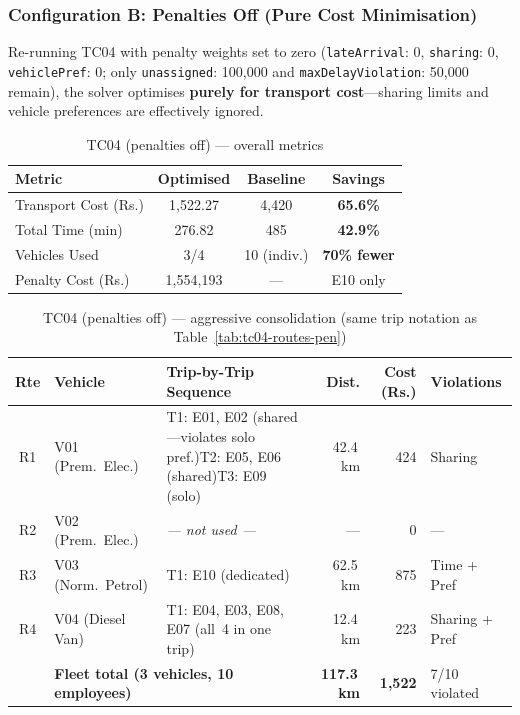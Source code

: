 \documentclass[11pt,a4paper]{article}
\newcommand{\rupee}{Rs.}
\newcommand{\code}[1]{\texttt{#1}}
\newcommand{\saving}[1]{\textcolor{velgreen}{\textbf{#1}}}
\newcommand{\xmark}{\textcolor{velred}{\ding{55}}}
\begin{document}
\subsubsection{Configuration B: Penalties Off (Pure Cost Minimisation)}

Re-running TC04 with penalty weights set to zero (\code{lateArrival}: 0, \code{sharing}: 0, \code{vehiclePref}: 0; only \code{unassigned}: 100,000 and \code{maxDelayViolation}: 50,000 remain), the solver optimises \textbf{purely for transport cost}---sharing limits and vehicle preferences are effectively ignored.

\begin{table}[H]
\centering
\caption{TC04 (penalties off) --- overall metrics}
\small
\begin{tabular}{lccc}
\toprule
\textbf{Metric} & \textbf{Optimised} & \textbf{Baseline} & \textbf{Savings} \\
\midrule
\rowcolor{rowalt}
Transport Cost (\rupee) & 1,522.27 & 4,420 & \saving{65.6\%} \\
Total Time (min) & 276.82 & 485 & \saving{42.9\%} \\
\rowcolor{rowalt}
Vehicles Used & 3/4 & 10 (indiv.) & \saving{70\% fewer} \\
Penalty Cost (\rupee) & 1,554,193 & --- & E10 only \\
\bottomrule
\end{tabular}
\end{table}

\begin{table}[H]
\centering
\caption{TC04 (penalties off) --- aggressive consolidation (same trip notation as Table~\ref{tab:tc04-routes-pen})}
\small
\renewcommand{\arraystretch}{1.2}
\begin{tabular}{@{}cl >{\raggedright\arraybackslash}p{4.6cm} rrl@{}}
\toprule
\textbf{Rte} & \textbf{Vehicle} & \textbf{Trip-by-Trip Sequence} & \textbf{Dist.} & \textbf{Cost (\rupee)} & \textbf{Violations} \\
\midrule
\rowcolor{rowalt}
R1 & V01 (Prem.\ Elec.) & T1: E01, E02 (shared---violates solo pref.)\newline T2: E05, E06 (shared)\newline T3: E09 (solo) & 42.4\,km & 424 & Sharing \xmark \\[4pt]
R2 & V02 (Prem.\ Elec.) & \textit{--- not used ---} & --- & 0 & --- \\[4pt]
\rowcolor{rowalt}
R3 & V03 (Norm.\ Petrol) & T1: E10 (dedicated) & 62.5\,km & 875 & Time + Pref \xmark \\
R4 & V04 (Diesel Van) & T1: E04, E03, E08, E07 (all~4 in one trip) & 12.4\,km & 223 & Sharing + Pref \xmark \\
\midrule
 & \multicolumn{2}{l}{\textbf{Fleet total (3 vehicles, 10 employees)}} & \textbf{117.3\,km} & \textbf{1,522} & 7/10 violated \\
\bottomrule
\end{tabular}
\renewcommand{\arraystretch}{1.0}
\end{table}
\end{document}
